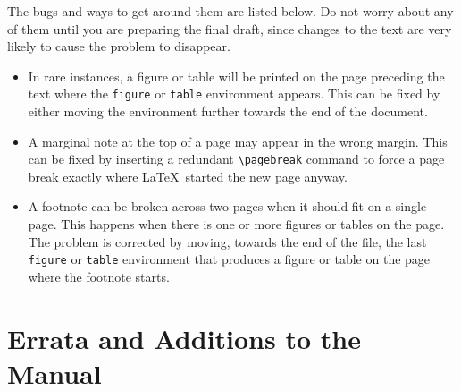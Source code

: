 The bugs and ways to get around them are listed below.  Do not worry
about any of them until you are preparing the final draft, since
changes to the text are very likely to cause the problem to disappear.
\begin{itemize}
\item In rare instances, a figure or table will be printed on the page
preceding the text where the {\tt figure} or {\tt table} environment
appears.  This can be fixed by either moving the environment further
towards the end of the document. 
 
\item A marginal note at the top of a page may appear in the wrong
margin.  This can be fixed by inserting a redundant \verb|\pagebreak|
command to force a page break exactly where \LaTeX\ started the new
page anyway.
 
\item A footnote can be broken across two pages when it should fit on a
single page.  This happens when there is one or more figures or tables
on the page.  The problem is corrected by moving, towards the end of the
file, the last {\tt figure} or {\tt table} environment that produces a
figure or table on the page where the footnote starts.
\end{itemize}
 
 
\section{Errata and Additions to the Manual}
 


 
 
